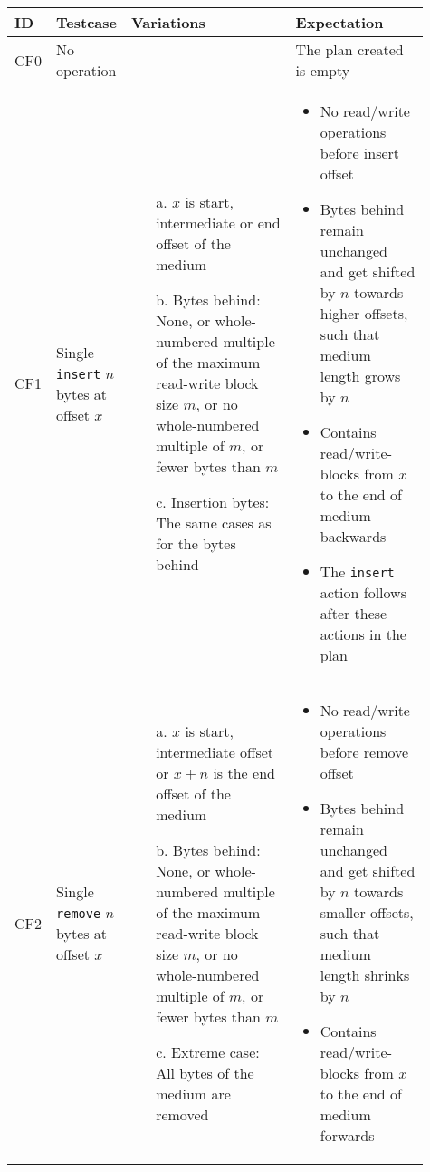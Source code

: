 \begin{landscape}
\begin{longtable}{|p{0.03\linewidth}|p{0.08\linewidth}|p{0.45\linewidth}|p{0.35\linewidth}|}
\hline
\rowcolor[gray]{.9}\textbf{ID} & \textbf{Testcase} & \textbf{Variations} & \textbf{Expectation} \\
\endhead
\hline
CF0 & No operation & - & The plan created is empty \\
\hline
CF1 & Single \texttt{insert} $n$ bytes at offset $x$ &
\begin{enumerate}
\item[a.] $x$ is start, intermediate or end offset of the medium
\item[b.] Bytes behind: None, or whole-numbered multiple of the maximum read-write block size $m$, or no whole-numbered multiple of $m$, or fewer bytes than $m$
\item[c.] Insertion bytes: The same cases as for the bytes behind
\end{enumerate}
& 
\begin{itemize}
\item No read/write operations before insert offset
\item Bytes behind remain unchanged and get shifted by $n$ towards higher offsets, such that medium length grows by $n$
\item Contains read/write-blocks from $x$ to the end of medium backwards
\item The \texttt{insert} action follows after these actions in the plan
\end{itemize}
\\
\hline
CF2 & Single \texttt{remove} $n$ bytes at offset $x$ &
\begin{enumerate}
\item[a.] $x$ is start, intermediate offset or $x+n$ is the end offset of the medium
\item[b.] Bytes behind: None, or whole-numbered multiple of the maximum read-write block size $m$, or no whole-numbered multiple of $m$, or fewer bytes than $m$
\item[c.] Extreme case: All bytes of the medium are removed
\end{enumerate}
& 
\begin{itemize}
\item No read/write operations before remove offset
\item Bytes behind remain unchanged and get shifted by $n$ towards smaller offsets, such that medium length shrinks by $n$
\item Contains read/write-blocks from $x$ to the end of medium forwards

\end{itemize}
\end{longtable}
\end{landscape}
